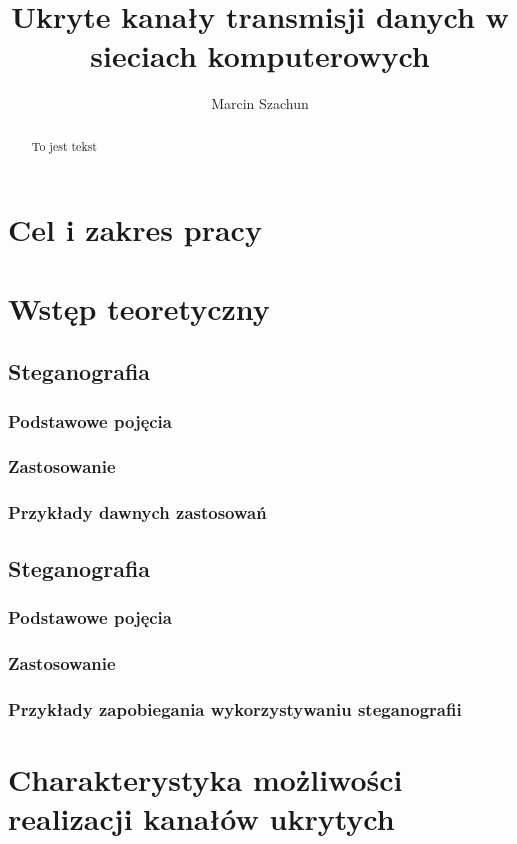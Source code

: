 \documentclass[a4paper]{report}
\begin{document}
\title{Ukryte kanały transmisji danych w sieciach komputerowych}
\author{Marcin Szachun}
\maketitle


\begin{abstract}
To jest tekst
\end{abstract}

\tableofcontents

\chapter{Cel i zakres pracy}
\chapter{Wstęp teoretyczny}
    \section{Steganografia}
        \subsection{Podstawowe pojęcia}
        \subsection{Zastosowanie}
        \subsection{Przykłady dawnych zastosowań}

    \section{Steganografia}
        \subsection{Podstawowe pojęcia}
        \subsection{Zastosowanie}
        \subsection{Przykłady zapobiegania wykorzystywaniu steganografii}

\chapter{Charakterystyka możliwości realizacji kanałów ukrytych}
\end{document}
